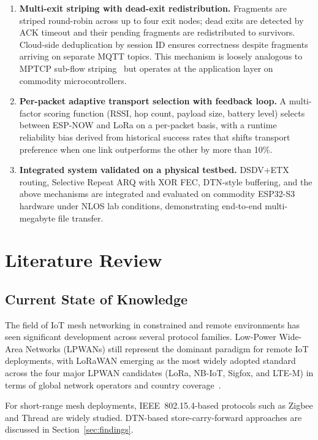 \documentclass[conference]{IEEEtran}
\begin{document}
\begin{enumerate}
  \item \textbf{Multi-exit striping with dead-exit redistribution.} Fragments are striped round-robin across up to four exit nodes; dead exits are detected by ACK timeout and their pending fragments are redistributed to survivors. Cloud-side deduplication by session ID ensures correctness despite fragments arriving on separate MQTT topics. This mechanism is loosely analogous to MPTCP sub-flow striping~\cite{ford2013mptcp} but operates at the application layer on commodity microcontrollers.
  \item \textbf{Per-packet adaptive transport selection with feedback loop.} A multi-factor scoring function (RSSI, hop count, payload size, battery level) selects between ESP-NOW and LoRa on a per-packet basis, with a runtime reliability bias derived from historical success rates that shifts transport preference when one link outperforms the other by more than 10\%.
  \item \textbf{Integrated system validated on a physical testbed.} DSDV+ETX routing, Selective Repeat ARQ with XOR FEC, DTN-style buffering, and the above mechanisms are integrated and evaluated on commodity ESP32-S3 hardware under NLOS lab conditions, demonstrating end-to-end multi-megabyte file transfer.
\end{enumerate}

\section{Literature Review}
\label{sec:litreview}

\subsection{Current State of Knowledge}

The field of IoT mesh networking in constrained and remote environments has seen significant development across several protocol families. Low-Power Wide-Area Networks (LPWANs) still represent the dominant paradigm for remote IoT deployments, with LoRaWAN emerging as the most widely adopted standard across the four major LPWAN candidates (LoRa, NB-IoT, Sigfox, and LTE-M) in terms of global network operators and country coverage~\cite{maurya2025lorawan}.

For short-range mesh deployments, IEEE~802.15.4-based protocols such as Zigbee and Thread are widely studied. DTN-based store-carry-forward approaches are discussed in Section~\ref{sec:findings}.
\end{document}
